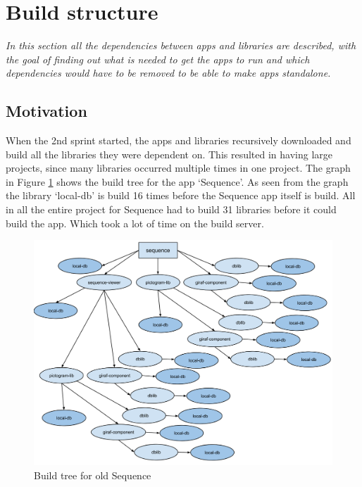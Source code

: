 \usepackage{mathtools}
\section{Build structure}
\label{Sprint2_buildstructure}
\textit{In this section all the dependencies between apps and libraries are described, with the goal of finding out what is needed to get the apps to run and which dependencies would have to be removed to be able to make apps standalone.}

\subsection{Motivation}

When the 2nd sprint started, the apps and libraries recursively downloaded and build all the libraries they were dependent on. This resulted in having large projects, since many libraries occurred multiple times in one project. The graph in Figure \ref{oldbuild} shows the build tree for the app ‘Sequence’. As seen from the graph the library ‘local-db’ is build 16 times before the Sequence app itself is build. All in all the entire project for Sequence had to build 31 libraries before it could build the app. Which took a lot of time on the build server.

\begin{figure}[H]
	\centering
	\includegraphics[width=0.8 \textwidth]{pictures/oldbuild.png}
	\caption{Build tree for old Sequence}
	\label{oldbuild}
\end{figure}

